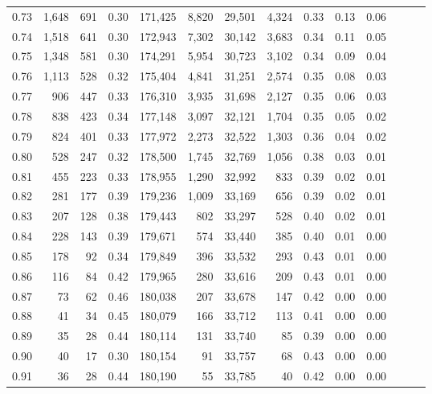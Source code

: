 \begin{tabular}{rrrrrrrrrrrrrr}
0.73 &  1,648 &    691 &  0.30 &  171,425 &    8,820 &  29,501 &   4,324 &  0.33 &  0.13 &      0.06 \\
0.74 &  1,518 &    641 &  0.30 &  172,943 &    7,302 &  30,142 &   3,683 &  0.34 &  0.11 &      0.05 \\
0.75 &  1,348 &    581 &  0.30 &  174,291 &    5,954 &  30,723 &   3,102 &  0.34 &  0.09 &      0.04 \\
0.76 &  1,113 &    528 &  0.32 &  175,404 &    4,841 &  31,251 &   2,574 &  0.35 &  0.08 &      0.03 \\
0.77 &    906 &    447 &  0.33 &  176,310 &    3,935 &  31,698 &   2,127 &  0.35 &  0.06 &      0.03 \\
0.78 &    838 &    423 &  0.34 &  177,148 &    3,097 &  32,121 &   1,704 &  0.35 &  0.05 &      0.02 \\
0.79 &    824 &    401 &  0.33 &  177,972 &    2,273 &  32,522 &   1,303 &  0.36 &  0.04 &      0.02 \\
0.80 &    528 &    247 &  0.32 &  178,500 &    1,745 &  32,769 &   1,056 &  0.38 &  0.03 &      0.01 \\
0.81 &    455 &    223 &  0.33 &  178,955 &    1,290 &  32,992 &     833 &  0.39 &  0.02 &      0.01 \\
0.82 &    281 &    177 &  0.39 &  179,236 &    1,009 &  33,169 &     656 &  0.39 &  0.02 &      0.01 \\
0.83 &    207 &    128 &  0.38 &  179,443 &      802 &  33,297 &     528 &  0.40 &  0.02 &      0.01 \\
0.84 &    228 &    143 &  0.39 &  179,671 &      574 &  33,440 &     385 &  0.40 &  0.01 &      0.00 \\
0.85 &    178 &     92 &  0.34 &  179,849 &      396 &  33,532 &     293 &  0.43 &  0.01 &      0.00 \\
0.86 &    116 &     84 &  0.42 &  179,965 &      280 &  33,616 &     209 &  0.43 &  0.01 &      0.00 \\
0.87 &     73 &     62 &  0.46 &  180,038 &      207 &  33,678 &     147 &  0.42 &  0.00 &      0.00 \\
0.88 &     41 &     34 &  0.45 &  180,079 &      166 &  33,712 &     113 &  0.41 &  0.00 &      0.00 \\
0.89 &     35 &     28 &  0.44 &  180,114 &      131 &  33,740 &      85 &  0.39 &  0.00 &      0.00 \\
0.90 &     40 &     17 &  0.30 &  180,154 &       91 &  33,757 &      68 &  0.43 &  0.00 &      0.00 \\
0.91 &     36 &     28 &  0.44 &  180,190 &       55 &  33,785 &      40 &  0.42 &  0.00 &      0.00 \\

\end{tabular}
